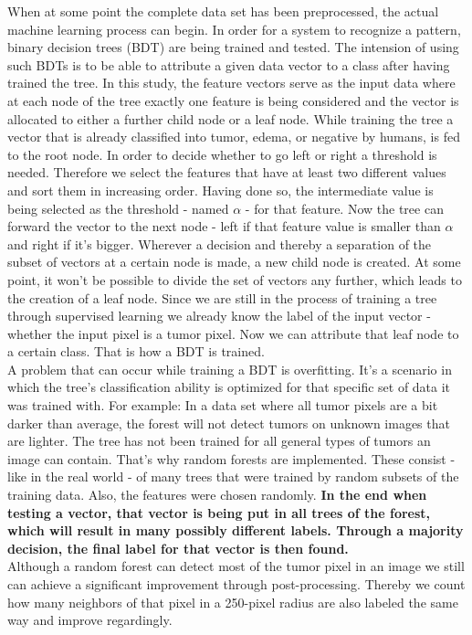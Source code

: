 \documentclass{article}
\begin{document}
 When at some point the complete data set has been preprocessed, the actual machine learning process can begin. In order for a system to recognize a pattern, binary decision trees (BDT) are being trained and tested. The intension of using such BDTs is to be able to attribute a given data vector to a class after having trained the tree. In this study, the feature vectors serve as the input data where at each node of the tree exactly one feature is being considered and the vector is allocated to either a further child node or a leaf node. While training the tree a vector that is already classified into tumor, edema, or negative by humans, is fed to the root node. In order to decide whether to go left or right a threshold is needed. Therefore we select the features that have at least two different values and sort them in increasing order. Having done so, the intermediate value is being selected as the threshold - named $\alpha $ - for that feature. Now the tree can forward the vector to the next node - left if that feature value is smaller than $\alpha $ and right if it's bigger. Wherever a decision and thereby a separation of the subset of vectors at a certain node is made, a new child node is created. At some point, it won't be possible to divide the set of vectors any further, which leads to the creation of a leaf node. Since we are still in the process of training a tree through supervised learning we already know the label of the input vector - whether the input pixel is a tumor pixel. Now we can attribute that leaf node to a certain class. That is how a BDT is trained. \\


 A problem that can occur while training a BDT is overfitting. It's a scenario in which the tree's classification ability is optimized for that specific set of data it was trained with. For example: In a data set where all tumor pixels are a bit darker than average, the forest will not detect tumors on unknown images that are lighter. The tree has not been trained for all general types of tumors an image can contain. That's why random forests are implemented. These consist - like in the real world - of many trees that were trained by random subsets of the training data. Also, the features were chosen randomly. \textbf{In the end when testing a vector, that vector is being put in all trees of the forest, which will result in many possibly different labels. Through a majority decision, the final label for that vector is then found.}\\


 Although a random forest can detect most of the tumor pixel in an image we still can achieve a significant improvement through post-processing. Thereby we count how many neighbors of that pixel in a 250-pixel radius are also labeled the same way and improve regardingly. 
\end{document}
